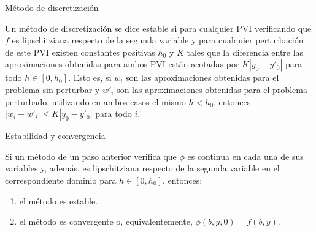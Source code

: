 		\begin{frame}{Método de discretización}
			\begin{definition}
				Un método de discretización se dice estable si para cualquier PVI verificando que $f$ es lipschitziana respecto de la segunda variable y para cualquier perturbación de este PVI existen constantes positivas $h_0$ y $K$ tales que la diferencia entre las aproximaciones obtenidas para ambos PVI están acotadas por $K |y_0 - y'_0|$ para todo $h \in [0,h_0]$. Esto es, si $w_i$ son las aproximaciones obtenidas para el problema sin perturbar y $w'_i$ son las aproximaciones obtenidas para el problema perturbado, utilizando en ambos casos el mismo $h < h_0$, entonces $\left|w_i - w'_i\right| \le K |y_0 - y'_0|$ para todo $i$.
			\end{definition}
		\end{frame}
		
		\begin{frame}{Estabilidad y convergencia}
			\begin{theorem}
				Si un método de un paso anterior verifica que $\phi$ es continua en cada una de sus variables y, además, es lipschitziana respecto de la segunda variable en el correspondiente dominio para $h \in [0, h_0]$, entonces:
				
				\begin{enumerate}
					\item el método es estable.
					\item el método es convergente o, equivalentemente, $\phi(b,y,0) = f(b,y)$.
				\end{enumerate}
			\end{theorem}
		\end{frame}